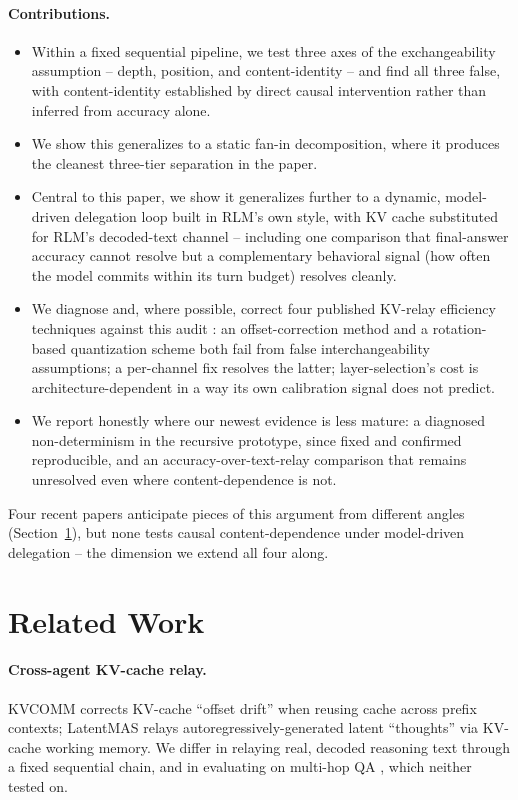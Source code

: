 \documentclass[11pt]{article}
\begin{document}
\paragraph{Contributions.}
\begin{itemize}
\item Within a fixed sequential pipeline, we test three axes of the
exchangeability assumption -- depth, position, and content-identity --
and find all three false, with content-identity established by direct
causal intervention rather than inferred from accuracy alone.
\item We show this generalizes to a static fan-in decomposition, where it
produces the cleanest three-tier separation in the paper.
\item Central to this paper, we show it generalizes further to a
dynamic, model-driven delegation loop built in RLM's own style, with KV
cache substituted for RLM's decoded-text channel -- including one
comparison that final-answer accuracy cannot resolve but a complementary
behavioral signal (how often the model commits within its turn budget)
resolves cleanly.
\item We diagnose and, where possible, correct four published KV-relay
efficiency techniques against this audit \citep{kvcomm2025,turboquant2026,polarquant2026,kivi2024}:
an offset-correction method and a rotation-based quantization scheme both
fail from false interchangeability assumptions; a per-channel fix
resolves the latter; layer-selection's cost is architecture-dependent in
a way its own calibration signal does not predict.
\item We report honestly where our newest evidence is less mature: a
diagnosed non-determinism in the recursive prototype, since fixed and
confirmed reproducible, and an accuracy-over-text-relay comparison that
remains unresolved even where content-dependence is not.
\end{itemize}

Four recent papers anticipate pieces of this argument from different
angles \citep{pitfallskv2026,rethinkredundancy2026,adak2026,canonicalmerge2026}
(Section~\ref{sec:related}), but none tests causal content-dependence
under model-driven delegation -- the dimension we extend all four along.

\section{Related Work}
\label{sec:related}

\paragraph{Cross-agent KV-cache relay.} KVCOMM \citep{kvcomm2025} corrects
KV-cache ``offset drift'' when reusing cache across prefix contexts;
LatentMAS \citep{latentmas2026} relays autoregressively-generated latent
``thoughts'' via KV-cache working memory. We differ in relaying real,
decoded reasoning text through a fixed sequential chain, and in
evaluating on multi-hop QA \citep{hotpotqa2018}, which neither tested on.
\end{document}
